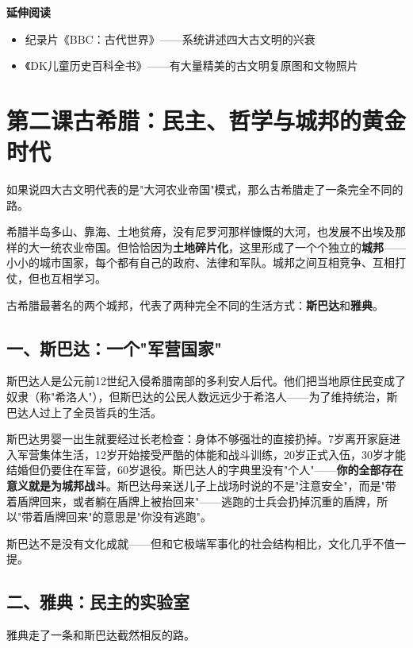 \documentclass[a4paper,12pt]{ctexart}
\begin{document}
\vspace{0.3cm}
\textcolor{blue!70!black}{\textbf{延伸阅读}}
\begin{itemize}
  \item 纪录片《BBC：古代世界》——系统讲述四大古文明的兴衰
  \item 《DK儿童历史百科全书》——有大量精美的古文明复原图和文物照片
\end{itemize}

\newpage

\section{\textcolor{orange!80!black}{第二课\quad 古希腊：民主、哲学与城邦的黄金时代}}

如果说四大古文明代表的是"大河农业帝国"模式，那么古希腊走了一条完全不同的路。

希腊半岛多山、靠海、土地贫瘠，没有尼罗河那样慷慨的大河，也发展不出埃及那样的大一统农业帝国。但恰恰因为\textbf{土地碎片化}，这里形成了一个个独立的\textbf{城邦}——小小的城市国家，每个都有自己的政府、法律和军队。城邦之间互相竞争、互相打仗，但也互相学习。

古希腊最著名的两个城邦，代表了两种完全不同的生活方式：\textbf{斯巴达}和\textbf{雅典}。

\subsection*{一、斯巴达：一个"军营国家"}

斯巴达人是公元前12世纪入侵希腊南部的多利安人后代。他们把当地原住民变成了奴隶（称"希洛人"），但斯巴达的公民人数远远少于希洛人——为了维持统治，斯巴达人过上了全员皆兵的生活。

斯巴达男婴一出生就要经过长老检查：身体不够强壮的直接扔掉。7岁离开家庭进入军营集体生活，12岁开始接受严酷的体能和战斗训练，20岁正式入伍，30岁才能结婚但仍要住在军营，60岁退役。斯巴达人的字典里没有"个人"——\textbf{你的全部存在意义就是为城邦战斗}。斯巴达母亲送儿子上战场时说的不是"注意安全"，而是"带着盾牌回来，或者躺在盾牌上被抬回来"——逃跑的士兵会扔掉沉重的盾牌，所以"带着盾牌回来"的意思是"你没有逃跑"。

斯巴达不是没有文化成就——但和它极端军事化的社会结构相比，文化几乎不值一提。

\subsection*{二、雅典：民主的实验室}

雅典走了一条和斯巴达截然相反的路。
\end{document}

